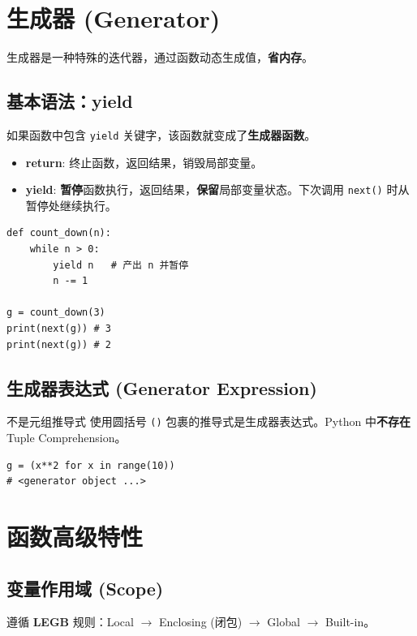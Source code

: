 \documentclass[12pt, a4paper]{article}
\begin{document}
\section{生成器 (Generator)}

生成器是一种特殊的迭代器，通过函数动态生成值，\textbf{省内存}。

\subsection{基本语法：yield}

如果函数中包含 \texttt{yield} 关键字，该函数就变成了\textbf{生成器函数}。

\begin{itemize}
    \item \textbf{return}: 终止函数，返回结果，销毁局部变量。
    \item \textbf{yield}: \textbf{暂停}函数执行，返回结果，\textbf{保留}局部变量状态。下次调用 \texttt{next()} 时从暂停处继续执行。
\end{itemize}

\begin{lstlisting}
def count_down(n):
    while n > 0:
        yield n   # 产出 n 并暂停
        n -= 1

g = count_down(3)
print(next(g)) # 3
print(next(g)) # 2
\end{lstlisting}

\subsection{生成器表达式 (Generator Expression)}

\begin{trapbox}{不是元组推导式}
使用圆括号 \texttt{()} 包裹的推导式是生成器表达式。Python 中\textbf{不存在} Tuple Comprehension。
\begin{lstlisting}
g = (x**2 for x in range(10)) 
# <generator object ...>
\end{lstlisting}
\end{trapbox}

\section{函数高级特性}

\subsection{变量作用域 (Scope)}

遵循 \textbf{LEGB} 规则：Local $\to$ Enclosing (闭包) $\to$ Global $\to$ Built-in。
\end{document}
